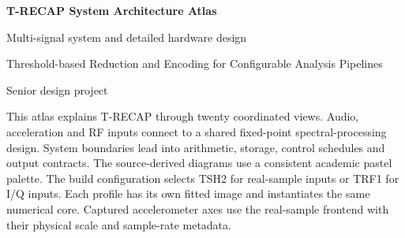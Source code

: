 \documentclass[11pt,letterpaper]{article}
\begin{document}
\begin{center}{\LARGE\bfseries T-RECAP System Architecture Atlas}\par\vspace{6pt}
{\large Multi-signal system and detailed hardware design}\par\vspace{6pt}
{\small Threshold-based Reduction and Encoding for Configurable Analysis Pipelines}\par\vspace{4pt}
{\small Senior design project}\end{center}
This atlas explains T-RECAP through twenty coordinated views. Audio, acceleration and RF inputs connect to a shared fixed-point spectral-processing design. System boundaries lead into arithmetic, storage, control schedules and output contracts. The source-derived diagrams use a consistent academic pastel palette.
The build configuration selects TSH2 for real-sample inputs or TRF1 for I/Q inputs. Each profile has its own fitted image and instantiates the same numerical core. Captured accelerometer axes use the real-sample frontend with their physical scale and sample-rate metadata.
\end{document}
